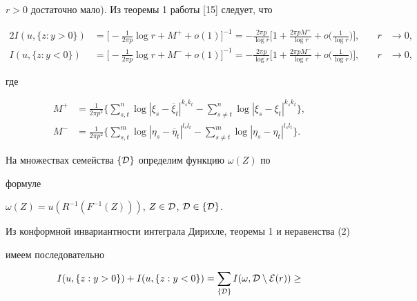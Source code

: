 \begin{pf}
$r>0$ достаточно мало). Из теоремы 1 работы [15] следует, что


\begin{alignat*}{2}


I(u,\{z: y>0\})&=\bigg[-\frac{1}{2\pi p}\log r+M^{+}+o(1)\bigg]^{-1}=


-\frac{2\pi p}{\log r}\bigg[1+\frac{2\pi p M^{+}}{\log r}


+o\bigg(\frac{1}{\log r}\bigg)\bigg],&\quad r&\to 0,\\


%


I(u,\{z: y<0\})&=\bigg[- \frac{1}{2\pi p}\log r+M^{-}+o(1)\bigg]^{-1}=


-\frac{2\pi p}{\log r}\bigg[1+\frac{2\pi pM^{-}}{\log r}


+o\bigg(\frac{1}{\log r}\bigg)\bigg],&\quad r&\to 0,


\end{alignat*}


где


\begin{align*}


M^{+}&=\frac{1}{2\pi p^2}\bigg\{\sum\limits_{s,t}^{n}


\log |\xi_s-\overline{\xi}_t|^{k_{s} k_{t}}-\sum\limits_{s\neq t}^{n}


\log |\xi_s-\xi_t|^{k_{s} k_{t}}\bigg\}, \\


%


M^{-}&=\frac{1}{2\pi p^2}\bigg\{\sum\limits_{s,t}^{m}\log


|\eta_s-\overline{\eta}_t|^{l_{s}l_{t}}-\sum\limits_{s\neq t}^{m}\log


|\eta_s-\eta_t|^{l_{s}l_{t}}\bigg\}.


\end{align*}


На множествах семейства $\{{\cal D}\}$ определим функцию $\omega(Z)$ по


формуле


$\omega(Z)=u(R^{-1}(F^{-1}(Z)))$, $Z\in{\cal D}$, ${\cal D}\in \{{\cal D}\}$.


Из конформной инвариантности интеграла Дирихле, теоремы 1 и неравенства (2)


имеем последовательно


\begin{multline*}


I(u,\{z: y>0\})+I(u,\{z: y<0\})=\sum\limits_{\{{\cal D}\}}


I(\omega, {\cal D}\setminus{\cal E}(r))\geq \\



\end{multline*}
\end{pf}
